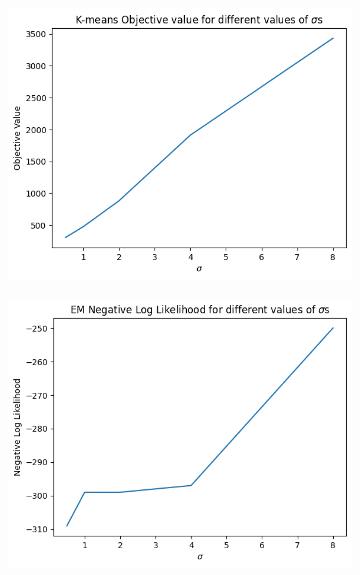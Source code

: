 \begin{soln}
    \begin{figure}[H]
        \begin{subfigure}{0.5\textwidth}
            \centering
            \includegraphics[scale=0.35]{Images/q12/q12_km.png}
        \end{subfigure}%
        \begin{subfigure}{0.5\textwidth}
            \centering
            \includegraphics[scale=0.35]{Images/q12/q12_em.png}
        \end{subfigure}
    \end{figure}
    \begin{figure}[H]

\end{figure}
\end{soln}
